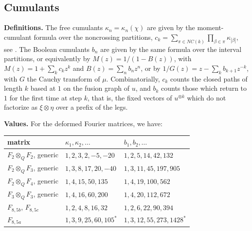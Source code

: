 \documentclass[11pt]{amsart}
\begin{document}
\subsection{Cumulants}

\noindent\textbf{Definitions.} The free cumulants $\kappa_n=\kappa_n(\chi)$ are given by the moment-cumulant formula over the noncrossing partitions, $c_k=\sum_{\pi\in NC(k)}\prod_{\beta\in\pi}\kappa_{|\beta|}$, see \cite{nsp}. The Boolean cumulants $b_n$ are given by the same formula over the interval partitions, or equivalently by $M(z)=1/(1-B(z))$, with $M(z)=1+\sum_kc_kz^k$ and $B(z)=\sum_nb_nz^n$, or by $1/G(z)=z-\sum_kb_{k+1}z^{-k}$, with $G$ the Cauchy transform of $\mu$. Combinatorially, $c_k$ counts the closed paths of length $k$ based at $1$ on the fusion graph of $u$, and $b_k$ counts those which return to $1$ for the first time at step $k$, that is, the fixed vectors of $u^{\otimes k}$ which do not factorize as $\xi\otimes\eta$ over a prefix of the legs.

\medskip

\noindent\textbf{Values.} For the deformed Fourier matrices, we have:

\medskip

\begin{center}
\begin{tabular}{lll}
\toprule
matrix & $\kappa_1,\kappa_2,\ldots$ & $b_1,b_2,\ldots$\\
\midrule
$F_2\otimes_QF_2$, generic & $1,2,3,2,-5,-20$ & $1,2,5,14,42,132$\\
$F_2\otimes_QF_3$, generic & $1,3,8,17,20,-40$ & $1,3,11,45,197,905$\\
$F_2\otimes_QF_4$, generic & $1,4,15,50,135$ & $1,4,19,100,562$\\
$F_3\otimes_QF_3$, generic & $1,4,16,60,200$ & $1,4,20,112,672$\\
$F_{8,5b}$, $F_{8,5c}$ & $1,2,4,8,16,32$ & $1,2,6,22,90,394$\\
$F_{8,5a}$ & $1,3,9,25,60,105^*$ & $1,3,12,55,273,1428^*$\\
\bottomrule
\end{tabular}
\end{center}

\medskip
\end{document}
